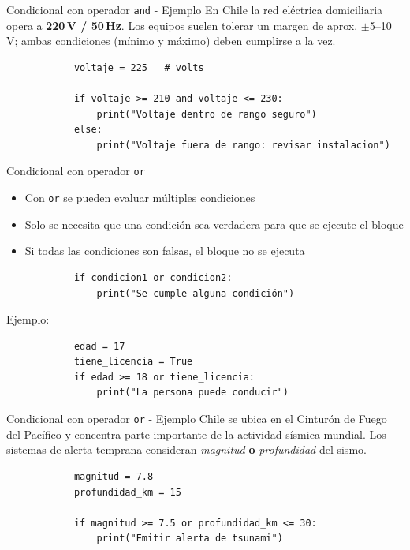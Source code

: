 \documentclass{beamer}
\begin{document}
    \begin{frame}[fragile,t]{Condicional con operador \texttt{and} - Ejemplo}
        En Chile la red eléctrica domiciliaria opera a \textbf{220\,V / 50\,Hz}. 
        Los equipos suelen tolerar un margen de aprox. $\pm$5--10\,V; ambas condiciones
        (mínimo y máximo) deben cumplirse a la vez.
        \begin{verbatim}
            voltaje = 225   # volts
 
            if voltaje >= 210 and voltaje <= 230:
                print("Voltaje dentro de rango seguro")
            else:
                print("Voltaje fuera de rango: revisar instalacion") 
        \end{verbatim}
    \end{frame}

    \begin{frame}[fragile,t]{Condicional con operador \texttt{or}}
        \begin{itemize}
            \item Con \texttt{or} se pueden evaluar múltiples condiciones
            \item Solo se necesita que una condición sea verdadera para que se ejecute el bloque
            \item Si todas las condiciones son falsas, el bloque no se ejecuta
        \end{itemize}
        \begin{verbatim}
            if condicion1 or condicion2:
                print("Se cumple alguna condición")
        \end{verbatim}
        Ejemplo:
        \begin{verbatim}
            edad = 17
            tiene_licencia = True
            if edad >= 18 or tiene_licencia:
                print("La persona puede conducir")
        \end{verbatim}
    \end{frame}

    \begin{frame}[fragile,t]{Condicional con operador \texttt{or} - Ejemplo}
        Chile se ubica en el Cinturón de Fuego del Pacífico y
        concentra parte importante de la actividad sísmica
        mundial. Los sistemas de alerta temprana consideran
        \emph{magnitud} \textbf{o} \emph{profundidad} del sismo.

        \begin{verbatim}
            magnitud = 7.8
            profundidad_km = 15
            
            if magnitud >= 7.5 or profundidad_km <= 30:
                print("Emitir alerta de tsunami")
        \end{verbatim}
    \end{frame}
\end{document}
